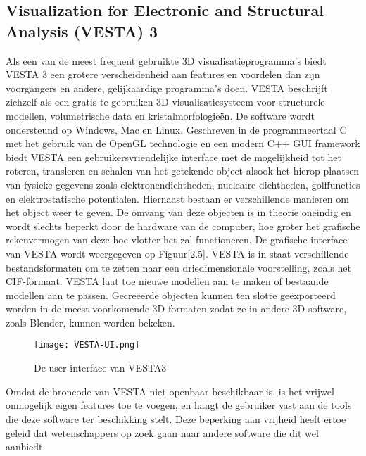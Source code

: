 \subsection{Visualization for Electronic and Structural Analysis (VESTA) 3}
Als een van de meest frequent gebruikte 3D visualisatieprogramma’s biedt VESTA 3 een grotere verscheidenheid aan features en voordelen dan zijn voorgangers en andere, gelijkaardige programma’s doen. VESTA beschrijft zichzelf als een gratis te gebruiken 3D visualisatiesysteem voor structurele modellen, volumetrische data en kristalmorfologieën. \citep*{VESTA1} De software wordt ondersteund op Windows, Mac en Linux. Geschreven in de programmeertaal C met het gebruik van de OpenGL technologie en een modern C++ GUI framework biedt VESTA een gebruikersvriendelijke interface met de mogelijkheid tot het roteren, transleren en schalen van het getekende object alsook het hierop plaatsen van fysieke gegevens zoals elektronendichtheden, nucleaire dichtheden, golffuncties en elektrostatische potentialen. Hiernaast bestaan er verschillende manieren om het object weer te geven. De omvang van deze objecten is in theorie oneindig en wordt slechts beperkt door de hardware van de computer, hoe groter het grafische rekenvermogen van deze hoe vlotter het zal functioneren. De grafische interface van VESTA wordt weergegeven op Figuur[2.5]. VESTA is in staat verschillende bestandsformaten om te zetten naar een driedimensionale voorstelling, zoals het CIF-formaat. VESTA laat toe nieuwe modellen aan te maken of bestaande modellen aan te passen. Gecreëerde objecten kunnen ten slotte geëxporteerd worden in de meest voorkomende 3D formaten zodat ze in andere 3D software, zoals Blender, kunnen worden bekeken.
\\
\begin{figure}[H]
\texttt{[image: VESTA-UI.png]}
\caption{De user interface van VESTA3}
\end{figure}

\par
 Omdat de broncode van VESTA niet openbaar beschikbaar is, is het vrijwel onmogelijk eigen features toe te voegen, en hangt de gebruiker vast aan de tools die deze software ter beschikking stelt. Deze beperking aan vrijheid heeft ertoe geleid dat wetenschappers op zoek gaan naar andere software die dit wel aanbiedt.

